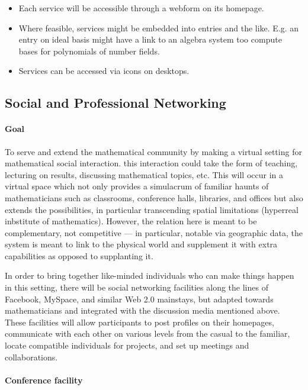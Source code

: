 \begin{itemize}
\item
  Each service will be accessible through a webform on its homepage.
\item
  Where feasible, services might be embedded into entries and the like.
  E.g. an entry on ideal basis might have a link to an algebra system
  too compute bases for polynomials of number fields.
\item
  Services can be accessed via icons on desktops.
\end{itemize}

\subsection{Social and Professional Networking}

\paragraph{Goal} To serve and extend the mathematical community by making a virtual
setting for mathematical social interaction. this interaction could take
the form of teaching, lecturing on results, discussing mathematical
topics, etc. This will occur in a virtual space which not only provides
a simulacrum of familiar haunts of mathematicians such as classrooms,
conference halls, libraries, and offices but also extends the
possibilities, in particular transcending spatial limitations (hyperreal
inbstitute of mathematics). However, the relation here is meant to be
complementary, not competitive --- in particular, notable via geographic
data, the system is meant to link to the physical world and supplement
it with extra capabilities as opposed to supplanting it.

In order to bring together like-minded individuals who can make things
happen in this setting, there will be social networking facilities along
the lines of Facebook, MySpace, and similar Web 2.0 mainstays, but
adapted towards mathematicians and integrated with the discussion media
mentioned above. These facilities will allow participants to post
profiles on their homepages, communicate with each other on various
levels from the casual to the familiar, locate compatible individuals
for projects, and set up meetings and collaborations.

\paragraph{Conference facility}

